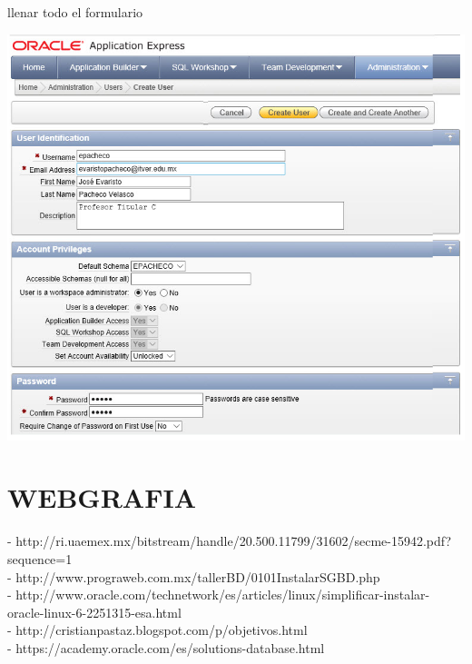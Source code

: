 \documentclass[12pt,letterpaper]{article}
\begin{document}
llenar todo el formulario
\begin{center}
\includegraphics[width=15cm]{./IMG/img34}
\end{center}


\section{WEBGRAFIA } 

- http://ri.uaemex.mx/bitstream/handle/20.500.11799/31602/secme-15942.pdf?sequence=1\\
- http://www.prograweb.com.mx/tallerBD/0101InstalarSGBD.php\\
- http://www.oracle.com/technetwork/es/articles/linux/simplificar-instalar-oracle-linux-6-2251315-esa.html\\
- http://cristianpastaz.blogspot.com/p/objetivos.html\\
- https://academy.oracle.com/es/solutions-database.html
\end{document}
